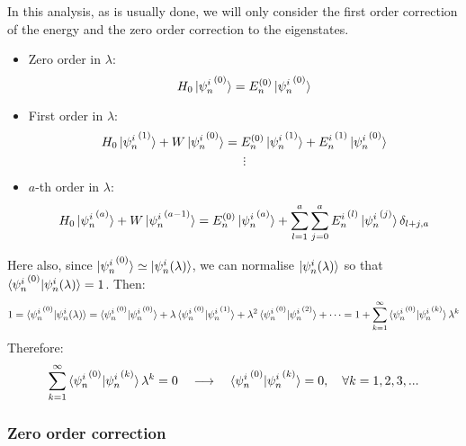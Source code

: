 In this analysis, as is usually done, we will only consider the first order correction of the energy and the zero order correction to the eigenstates.
\begin{itemize}
    \item Zero order in $\lambda$:
    \begin{equation}
        H_0\ket{{\psi_n^i}^{(0)}} = E_n^{(0)}\ket{{\psi_n^i}^{(0)}}
    \end{equation}
    \item First order in $\lambda$:
    \begin{equation} \label{first_order_correction_eig_eqn}
        H_0\ket{{\psi_n^i}^{(1)}} + W\ket{{\psi_n^i}^{(0)}} = E_n^{(0)}\ket{{\psi_n^i}^{(1)}} + {E_n^i}^{(1)}\ket{{\psi_n^i}^{(0)}}
    \end{equation}
    $$
    \vdots
    $$
    \item $a$-th order in $\lambda$:
    \begin{equation}
        H_0\ket{{\psi_n^i}^{(a)}} + W \ket{{\psi_n^i}^{(a-1)}} =E_n^{(0)}\ket{{\psi_n^i}^{(a)}} + \sum_{l=1}^a\sum_{j=0}^{a}{E_n^i}^{(l)}\ket{{\psi_n^i}^{(j)}}\delta_{l+j,a}
    \end{equation}
\end{itemize}

Here also, since $\ket{{\psi_n^i}^{(0)}}\simeq \ket{\psi_n^i(\lambda)}$, we can normalise $\ket{{\psi_n^i}(\lambda)}$ so that $\braket{{\psi_n^i}^{(0)}|\psi_n^i(\lambda)} = 1$. Then:
\begin{equation}
    1 = \braket{{\psi_n^i}^{(0)}|\psi_n^i(\lambda)} = \braket{{\psi_n^i}^{(0)}|{\psi_n^i}^{(0)}} + \lambda \braket{{\psi_n^i}^{(0)}|{\psi_n^i}^{(1)}} + \lambda^2\braket{{\psi_n^i}^{(0)}|{\psi_n^i}^{(2)}} + \cdots = 1 + \sum_{k=1}^\infty \braket{{\psi_n^i}^{(0)}|{\psi_n^i}^{(k)}}\lambda^k
\end{equation}
Therefore:
\begin{equation} 
    \sum_{k=1}^\infty \braket{{\psi_n^i}^{(0)}|{\psi_n^i}^{(k)}}\lambda^k = 0 \quad\longrightarrow\quad \braket{{\psi_n^i}^{(0)}|{\psi_n^i}^{(k)}} = 0,\quad \forall k = 1, 2, 3, ...
\end{equation}

\subsubsection{Zero order correction}

